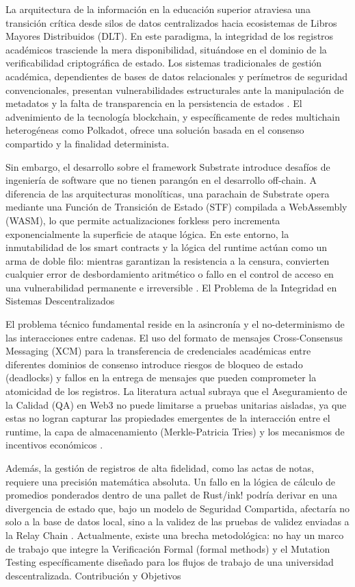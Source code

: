 La arquitectura de la información en la educación superior atraviesa una transición crítica desde silos de datos centralizados hacia ecosistemas de Libros Mayores Distribuidos (DLT). En este paradigma, la integridad de los registros académicos trasciende la mera disponibilidad, situándose en el dominio de la verificabilidad criptográfica de estado. Los sistemas tradicionales de gestión académica, dependientes de bases de datos relacionales y perímetros de seguridad convencionales, presentan vulnerabilidades estructurales ante la manipulación de metadatos y la falta de transparencia en la persistencia de estados \cite{sharples2016blockchain}. El advenimiento de la tecnología blockchain, y específicamente de redes multichain heterogéneas como Polkadot, ofrece una solución basada en el consenso compartido y la finalidad determinista.

Sin embargo, el desarrollo sobre el framework Substrate introduce desafíos de ingeniería de software que no tienen parangón en el desarrollo off-chain. A diferencia de las arquitecturas monolíticas, una parachain de Substrate opera mediante una Función de Transición de Estado (STF) compilada a WebAssembly (WASM), lo que permite actualizaciones forkless pero incrementa exponencialmente la superficie de ataque lógica. En este entorno, la inmutabilidad de los smart contracts y la lógica del runtime actúan como un arma de doble filo: mientras garantizan la resistencia a la censura, convierten cualquier error de desbordamiento aritmético o fallo en el control de acceso en una vulnerabilidad permanente e irreversible \cite{tolmach2021survey}.
El Problema de la Integridad en Sistemas Descentralizados

El problema técnico fundamental reside en la asincronía y el no-determinismo de las interacciones entre cadenas. El uso del formato de mensajes Cross-Consensus Messaging (XCM) para la transferencia de credenciales académicas entre diferentes dominios de consenso introduce riesgos de bloqueo de estado (deadlocks) y fallos en la entrega de mensajes que pueden comprometer la atomicidad de los registros. La literatura actual subraya que el Aseguramiento de la Calidad (QA) en Web3 no puede limitarse a pruebas unitarias aisladas, ya que estas no logran capturar las propiedades emergentes de la interacción entre el runtime, la capa de almacenamiento (Merkle-Patricia Tries) y los mecanismos de incentivos económicos \cite{stefanko2023paraspell}.

Además, la gestión de registros de alta fidelidad, como las actas de notas, requiere una precisión matemática absoluta. Un fallo en la lógica de cálculo de promedios ponderados dentro de una pallet de Rust/ink! podría derivar en una divergencia de estado que, bajo un modelo de Seguridad Compartida, afectaría no solo a la base de datos local, sino a la validez de las pruebas de validez enviadas a la Relay Chain \cite{gao2022blockchain}. Actualmente, existe una brecha metodológica: no hay un marco de trabajo que integre la Verificación Formal (formal methods) y el Mutation Testing específicamente diseñado para los flujos de trabajo de una universidad descentralizada.
Contribución y Objetivos

